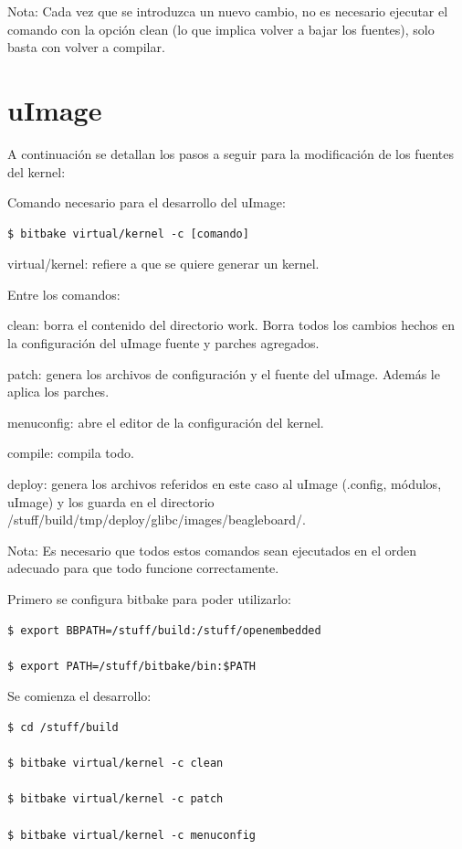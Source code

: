 \bigskip
Nota: Cada vez que se introduzca un nuevo cambio, no es necesario ejecutar el comando con la opción clean (lo que implica volver a bajar los fuentes), solo basta con volver a compilar.


\section{uImage}\label{ker}

A continuación se detallan los pasos a seguir para la modificación de los fuentes del kernel:
 
\bigskip
Comando necesario para el desarrollo del uImage:

\begin{verbatim}
$ bitbake virtual/kernel -c [comando]
\end{verbatim}

virtual/kernel: refiere a que se quiere generar un kernel.

\bigskip
Entre los comandos:

\bigskip
clean: borra el contenido del directorio work. Borra todos los cambios hechos en la configuración del uImage fuente y parches agregados.

patch: genera los archivos de configuración y el fuente del uImage. Además le aplica los parches.

menuconfig: abre el editor de la configuración del kernel.

compile: compila todo.

deploy: genera los archivos referidos en este caso al uImage (.config, módulos, uImage) y los guarda en el directorio /stuff/build/tmp/deploy/glibc/images/beagleboard/.

\bigskip
Nota: Es necesario que todos estos comandos sean ejecutados en el orden adecuado para que todo funcione correctamente.

\bigskip
Primero se configura bitbake para poder utilizarlo:

\begin{verbatim}
$ export BBPATH=/stuff/build:/stuff/openembedded

$ export PATH=/stuff/bitbake/bin:$PATH
\end{verbatim}

\bigskip
Se comienza el desarrollo:

\begin{verbatim}
$ cd /stuff/build

$ bitbake virtual/kernel -c clean

$ bitbake virtual/kernel -c patch

$ bitbake virtual/kernel -c menuconfig
\end{verbatim}


